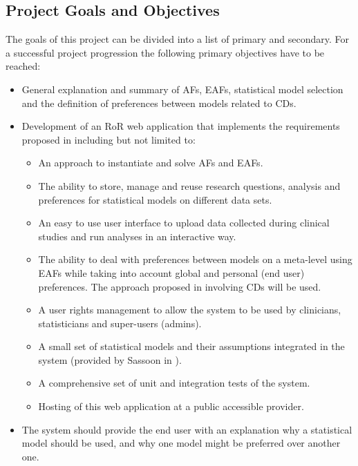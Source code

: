 \subsection{Project Goals and Objectives} 
\label{sub:aims}

The goals of this project can be divided into a list of primary and secondary. For a successful project progression the following primary objectives have to be reached:
\begin{itemize}
	\item General explanation and summary of \glspl{AF}, \glspl{EAF}, statistical model selection and the definition of preferences between models related to \glspl{CD}.
	\item Development of an \gls{RoR} web application that implements the requirements proposed in \cite{sassoon2014,sassoon2016CD} including but not limited to:
	\begin{itemize}
		\item An approach to instantiate and solve \glspl{AF} and \glspl{EAF}.
		\item The ability to store, manage and reuse research questions, analysis and preferences for statistical models on different data sets.
		\item An easy to use user interface to upload data collected during clinical studies and run analyses in an interactive way.
		\item The ability to deal with preferences between models on a meta-level using \glspl{EAF} while taking into account global and personal (end user) preferences. The approach proposed in \cite{sassoon2016CD} involving \glspl{CD} will be used.
		\item A user rights management to allow the system to be used by clinicians, statisticians and super-users (admins).
		\item A small set of statistical models and their assumptions integrated in the system (provided by Sassoon in \cite{sassoon2016CD}).
		\item A comprehensive set of unit and integration tests of the system.
		\item Hosting of this web application at a public accessible provider.
	\end{itemize}	
	\item The system should provide the end user with an explanation why a statistical model should be used, and why one model might be preferred over another one.
\end{itemize}

